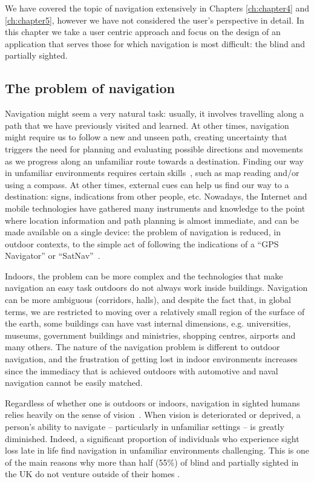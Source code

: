 We have covered the topic of navigation extensively in Chapters \ref{ch:chapter4} and \ref{ch:chapter5}, however we have not considered the user's perspective in detail. In this chapter we take a user centric approach and focus on the design of an application that serves those for which navigation is most difficult: the blind and partially sighted.

\subsection{The problem of navigation}

 Navigation might seem a very natural task: usually, it involves travelling along a path that we have previously visited and learned. At other times, navigation might require us to follow a new and unseen path, creating uncertainty that triggers the need for planning and evaluating possible directions and movements as we progress along an unfamiliar route towards a destination. Finding our way in unfamiliar environments requires certain skills~\citep{foulke1982perception}, such as map reading and/or using a compass. At other times, external cues can help us find our way to a destination: signs, indications from other people, etc. Nowadays, the Internet and mobile technologies have gathered many instruments and knowledge to the point where location information and path planning is almost immediate, and can be made available on a single device: the problem of navigation is reduced, in outdoor contexts, to the simple act of following the indications of a ``GPS Navigator'' or ``SatNav''~\citep{spirkovska2005summary}.

Indoors, the problem can be more complex and the technologies that make navigation an easy task outdoors do not always work inside buildings. Navigation can be more ambiguous (corridors, halls), and despite the fact that, in global terms, we are restricted to moving over a relatively small region of the surface of the earth, some buildings can have vast internal dimensions, e.g. universities, museums, government buildings and ministries, shopping centres, airports and many others. The nature of the navigation problem is different to outdoor navigation, and the frustration of getting lost in indoor environments increases since the immediacy that is achieved outdoors with automotive and naval navigation cannot be easily matched.
 
Regardless of whether one is outdoors or indoors, navigation in sighted humans relies heavily on the sense of vision~\citep{kalia2008learning,tsuji2005landmarks}. When vision is deteriorated or deprived, a person's ability to navigate -- particularly in unfamiliar settings -- is greatly diminished. Indeed, a significant proportion of individuals who experience sight loss late in life find navigation in unfamiliar environments challenging. This is one of the main reasons why more than half (55\%) of blind and partially sighted in the UK do not venture outside of their homes \citep{Worsfold2010}.

